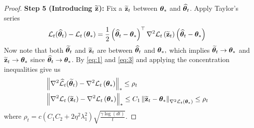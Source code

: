 \begin{proof}
\textbf{Step 5 (Introducing $\widetilde{\mathbf{z}}$):} Fix a $\widetilde{\mathbf{z}}_t$ between $\bm{\theta}_*$ and ${\widehat{\bm{\theta}}}_t$. Apply Taylor's series 
\begin{align}
    {\cal L}_{t}({\widehat{\bm{\theta}}}_{t})-{\cal L}_{t}\left(\bm{\theta}_{*}\right)=\frac{1}{2}\left({\widehat{\bm{\theta}}}_{t}-\bm{\theta}_{*}\right)^{\top} \nabla^{2} {\cal L}_{t}\left(\widetilde{\mathbf{z}}_{t}\right)\left({\widehat{\bm{\theta}}}_{t}-\bm{\theta}_{*}\right) \label{eq:Pt-z}
\end{align}
Now note that both $\widetilde{\bm{\theta}}_{t}$ and $\widetilde{\mathbf{z}}_{t}$ are between ${\widehat{\bm{\theta}}}_{t}$ and $\bm{\theta}_{*},$ which implies $\widetilde{\bm{\theta}}_{t} \rightarrow \bm{\theta}_{*}$ and $\widetilde{\mathbf{z}}_{t} \rightarrow \bm{\theta}_{*}$ since ${\widehat{\bm{\theta}}}_{t} \rightarrow \bm{\theta}_{*}$. By \eqref{eq:1} and \eqref{eq:3} and applying the concentration inequalities give us
\begin{align}
&\left\|\nabla^{2} \widehat{\cal L}_{t}(\widetilde{\bm{\theta}}_{t})-\nabla^{2} {\cal L}_{t}\left(\bm{\theta}_{*}\right)\right\|_{*} \leq \rho_t \label{eq:theta-ttheta}\\
&\left\|\nabla^{2} {\cal L}_{t}\left(\widetilde{\mathbf{z}}_{t}\right)-\nabla^{2} {\cal L}_{t}\left(\bm{\theta}_{*}\right)\right\|_{*} \leq C_{1}\left\|\widetilde{\mathbf{z}}_{t} - \bm{\theta}_{*}\right\|_{\nabla^{2} {\cal L}_{t}\left(\bm{\theta}_{*}\right)} \leq \rho_t \label{eq:theta-tz}
\end{align}
where $\rho_t=c\left(C_{1}C_{2} + 2\eta^2\lambda_1^2\right) \sqrt{\frac{\gamma \log (dt)}{t}}$.




\end{proof}
